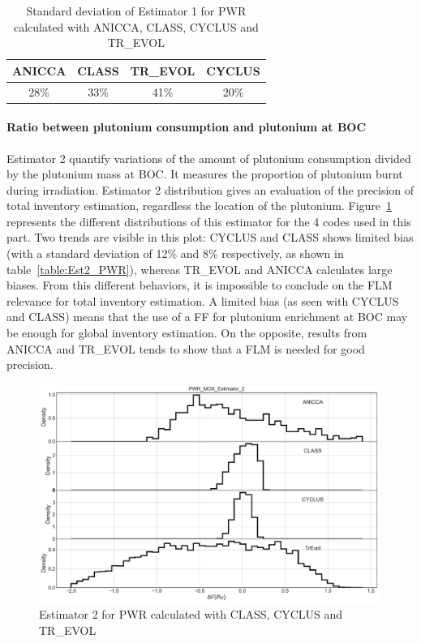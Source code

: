 \begin{table}[h]
	\begin{center}
		\begin{tabular}{|c||c||c||c|}
			\hline 
				ANICCA & CLASS & TR\_EVOL & CYCLUS \\
			\hline
				28\% & 33\% & 41\% & 20\% \\
			\hline
		\end{tabular}
	\end{center}
	\label{table:Est1_PWR}
	\caption{Standard deviation of Estimator 1 for \gls{PWR} calculated with ANICCA, CLASS, CYCLUS and TR\_EVOL}
\end{table}

\paragraph{Ratio between plutonium consumption and plutonium at \gls{BOC}}

Estimator 2 quantify variations of the amount of plutonium consumption divided by the plutonium mass at \gls{BOC}.
It measures the proportion of plutonium burnt during irradiation.
Estimator 2 distribution gives an evaluation of the precision of total inventory estimation, regardless the location of the plutonium.
Figure~\ref{fig:Est2_PWR} represents the different distributions of this estimator for the 4 codes used in this part.
Two trends are visible in this plot: CYCLUS and CLASS shows limited bias (with a standard deviation of 12\% and 8\% respectively, as shown in table~\ref{table:Est2_PWR}), whereas TR\_EVOL and ANICCA calculates large biases.
From this different behaviors, it is impossible to conclude on the \gls{FLM} relevance for total inventory estimation.
A limited bias (as seen with CYCLUS and CLASS) means that the use of a \gls{FF} for plutonium enrichment at \gls{BOC} may be enough for global inventory estimation.
On the opposite, results from ANICCA and TR\_EVOL tends to show that a \gls{FLM} is needed for good precision.

\begin{figure}[h]
	\begin{center}
		\includegraphics[width = 0.99\textwidth]{../../Feature_1/RAW_DATA/FIG/PWR_MOX_Estimator_2.pdf}
		\caption{Estimator 2 for \gls{PWR} calculated with CLASS, CYCLUS and TR\_EVOL}
		\label{fig:Est2_PWR}
	\end{center}
\end{figure}

